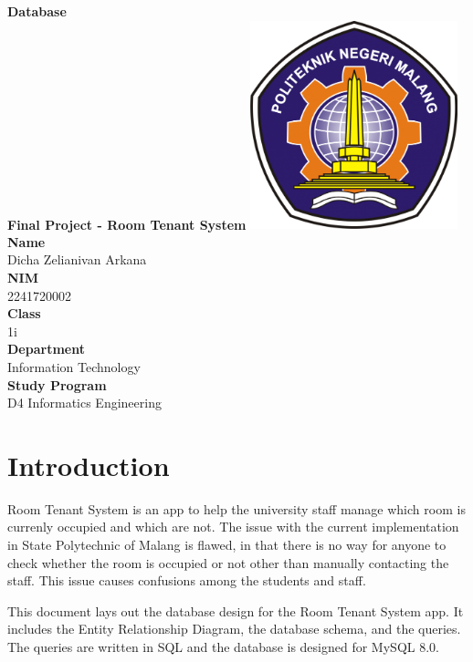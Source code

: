 \documentclass[12pt,titlepage]{article}
\newcommand{\vSubject}{Database}
\newcommand{\vSubtitle}{Final Project - Room Tenant System}
\newcommand{\vName}{Dicha Zelianivan Arkana}
\newcommand{\vNIM}{2241720002}
\newcommand{\vClass}{1i}
\newcommand{\vDepartment}{Information Technology}
\newcommand{\vStudyProgram}{D4 Informatics Engineering}
\begin{document}
\begin{titlepage}
    \centering
    \vfill
    {\bfseries\LARGE
        \vSubject\\
        \vskip0.25cm
        \vSubtitle
    }
    \vfill
    \includegraphics[width=6cm]{images/polinema-logo.png}
    \vfill
    {
        \textbf{Name}\\
        \vName\\
        \vskip0.5cm
        \textbf{NIM}\\
        \vNIM\\
        \vskip0.5cm
        \textbf{Class}\\
        \vClass\\
        \vskip0.5cm
        \textbf{Department}\\
        \vDepartment\\
        \vskip0.5cm
        \textbf{Study Program}\\
        \vStudyProgram
    }
\end{titlepage}

\tableofcontents

\pagebreak

\section{Introduction}
Room Tenant System is an app to help the university staff manage which room is currenly occupied and which are not.
The issue with the current implementation in State Polytechnic of Malang is flawed, in that there is no way for anyone
to check whether the room is occupied or not other than manually contacting the staff. This issue causes confusions among
the students and staff.

This document lays out the database design for the Room Tenant System app. It includes the Entity Relationship Diagram, the
database schema, and the queries. The queries are written in SQL and the database is designed for MySQL 8.0.
\end{document}
